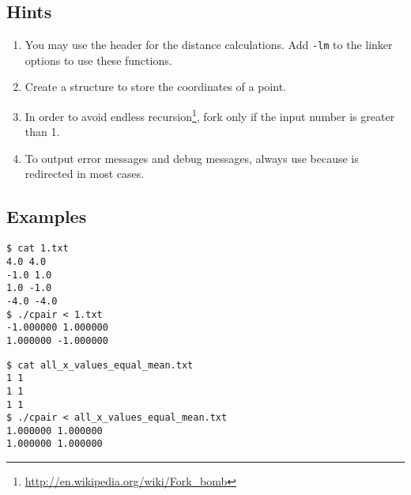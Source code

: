 \subsection*{Hints}
\begin{enumerate}
\item You may use the header  for the distance calculations.
Add \verb|-lm| to the linker options to use these functions.
\item Create a structure to store the coordinates of a point.
\item In order to avoid endless recursion\footnote{\url{http://en.wikipedia.org/wiki/Fork\_bomb}},
fork only if the input number is greater than 1.
\item To output error messages and debug messages, always use
 because  is redirected in most cases.
\end{enumerate}

\subsection*{Examples}
\begin{multicols}{2}
\begin{verbatim}
$ cat 1.txt
4.0 4.0
-1.0 1.0
1.0 -1.0
-4.0 -4.0
$ ./cpair < 1.txt
-1.000000 1.000000
1.000000 -1.000000
\end{verbatim}
\begin{verbatim}
$ cat all_x_values_equal_mean.txt
1 1
1 1
1 1
$ ./cpair < all_x_values_equal_mean.txt
1.000000 1.000000
1.000000 1.000000
\end{verbatim}
\end{multicols}

\osueguidelinestwo



